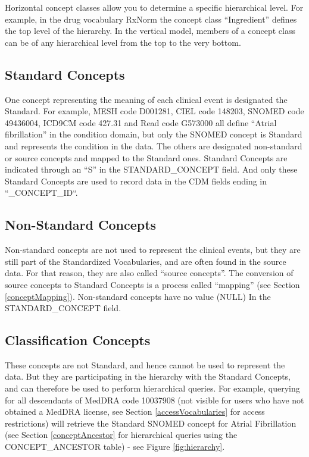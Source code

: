 \documentclass[11pt]{book}
\theoremstyle{definition}
\theoremstyle{definition}
\theoremstyle{definition}
\theoremstyle{remark}
\begin{document}
Horizontal concept classes allow you to determine a specific
hierarchical level. For example, in the drug vocabulary RxNorm the
concept class ``Ingredient'' defines the top level of the hierarchy. In
the vertical model, members of a concept class can be of any
hierarchical level from the top to the very bottom.

\subsection{Standard Concepts}\label{standardConcepts}

One concept representing the meaning of each clinical event is
designated the Standard. For example, MESH code D001281, CIEL code
148203, SNOMED code 49436004, ICD9CM code 427.31 and Read code G573000
all define ``Atrial fibrillation'' in the condition domain, but only the
SNOMED concept is Standard and represents the condition in the data. The
others are designated non-standard or source concepts and mapped to the
Standard ones. Standard Concepts are indicated through an ``S'' in the
STANDARD\_CONCEPT field. And only these Standard Concepts are used to
record data in the CDM fields ending in ``\_CONCEPT\_ID``.

\subsection{Non-Standard Concepts}\label{non-standard-concepts}

Non-standard concepts are not used to represent the clinical events, but
they are still part of the Standardized Vocabularies, and are often
found in the source data. For that reason, they are also called ``source
concepts''. The conversion of source concepts to Standard Concepts is a
process called ``mapping'' (see Section \ref{conceptMapping}).
Non-standard concepts have no value (NULL) In the STANDARD\_CONCEPT
field.

\subsection{Classification Concepts}\label{classification-concepts}

These concepts are not Standard, and hence cannot be used to represent
the data. But they are participating in the hierarchy with the Standard
Concepts, and can therefore be used to perform hierarchical queries. For
example, querying for all descendants of MedDRA code 10037908 (not
visible for users who have not obtained a MedDRA license, see Section
\ref{accessVocabularies} for access restrictions) will retrieve the
Standard SNOMED concept for Atrial Fibrillation (see Section
\ref{conceptAncestor} for hierarchical queries using the
CONCEPT\_ANCESTOR table) - see Figure \ref{fig:hierarchy}.
\end{document}
